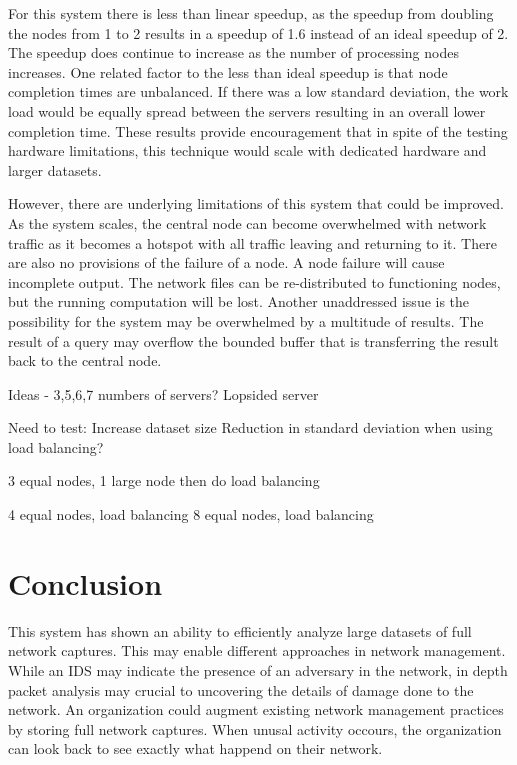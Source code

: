 \documentclass{article}
\begin{document}
\begin{multicols}{2}
For this system there is less than linear speedup, as the speedup from doubling the nodes from 1 to 2 results in a speedup of 1.6 instead of an ideal speedup of 2.  The speedup does continue to increase as the number of processing nodes increases. One related factor to the less than ideal speedup is that node completion times are unbalanced. If there was a low standard deviation, the work load would be equally spread between the servers resulting in an overall lower completion time.  %
These results provide encouragement that in spite of the testing hardware limitations, this technique would scale with dedicated hardware and larger datasets.

However, there are underlying limitations of this system that could be improved.  As the system scales, the central node can become overwhelmed with network traffic as it becomes a hotspot with all traffic leaving and returning to it. There are also no provisions of the failure of a node.  A node failure will cause incomplete output.  The network files can be re-distributed to functioning nodes, but the running computation will be lost.  Another unaddressed issue is the possibility for the system may be overwhelmed by a multitude of results. The result of a query may overflow the bounded buffer that is transferring the result back to the central node.  





Ideas - 3,5,6,7 numbers of servers?
Lopsided server





Need to test:
Increase dataset size
Reduction in standard deviation
when using load balancing?

3 equal nodes, 1 large node
then do load balancing

4 equal nodes, load balancing
8 equal nodes, load balancing





\section*{Conclusion}

This system has shown an ability to efficiently analyze large datasets of full network captures. This may enable different approaches in network management.  While an IDS may indicate the presence of an adversary in the network, in depth packet analysis may crucial to uncovering the details of damage done to the network.  An organization could augment existing network management practices by storing full network captures.  When unusal activity occours, the organization can look back to see exactly what happend on their network.  

\end{multicols}
\end{document}
